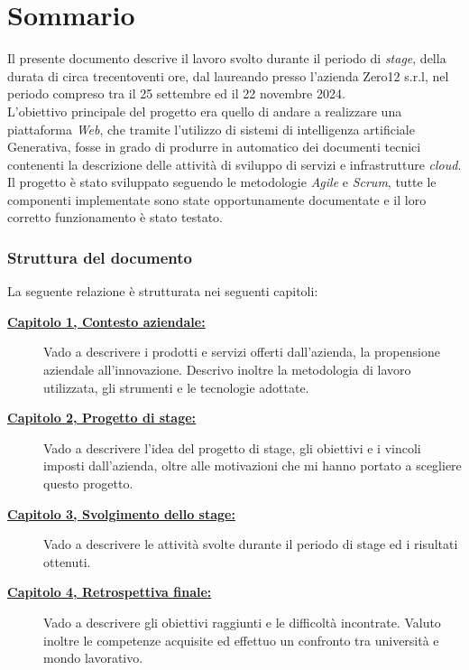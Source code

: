 \cleardoublepage
{}
{}
\begingroup
\let\clearpage\relax
\let\cleardoublepage\relax
\let\cleardoublepage\relax

\chapter*{Sommario}

\small 
Il presente documento descrive il lavoro svolto durante il periodo di \textit{stage}, della durata di circa trecentoventi ore, dal laureando \myName presso l'azienda Zero12 s.r.l, 
nel periodo compreso tra il 25 settembre ed il 22 novembre 2024. \\
L'obiettivo principale del progetto era quello di andare a realizzare una piattaforma \textit{Web}, che tramite l'utilizzo di sistemi di intelligenza artificiale Generativa, 
fosse in grado di produrre in automatico dei documenti tecnici contenenti la descrizione delle attività di sviluppo di servizi e infrastrutture \textit{cloud}. \\
Il progetto è stato sviluppato seguendo le metodologie \textit{Agile} e \textit{Scrum}, tutte le componenti implementate sono state opportunamente documentate e 
il loro corretto funzionamento è stato testato.\\ 

\subsection*{Struttura del documento}
La seguente relazione è strutturata nei seguenti capitoli:
\begin{description}
    \item[{\hyperref[cap:contesto-aziendale]{\textbf{Capitolo 1, Contesto aziendale:}}}]  Vado a descrivere i prodotti e servizi offerti dall'azienda, la propensione aziendale all'innovazione.
        Descrivo inoltre la metodologia di lavoro utilizzata, gli strumenti e le tecnologie adottate.
    \item[{\hyperref[cap:introduzione-al-progetto]{\textbf{Capitolo 2, Progetto di stage:}}}] Vado a descrivere l'idea del progetto di stage, gli obiettivi e i vincoli imposti dall'azienda, oltre alle motivazioni che mi hanno portato a scegliere questo progetto.
    \item[{\hyperref[cap:svolgimento-dello-stage]{\textbf{Capitolo 3, Svolgimento dello stage:}}}] Vado a descrivere le attività svolte durante il periodo di stage ed i risultati ottenuti.
    \item[{\hyperref[cap:retrospettiva-finale]{\textbf{Capitolo 4, Retrospettiva finale:}}}] Vado a descrivere gli obiettivi raggiunti e le difficoltà incontrate.
    Valuto inoltre le competenze acquisite ed effettuo un confronto tra università e mondo lavorativo.
\end{description}

